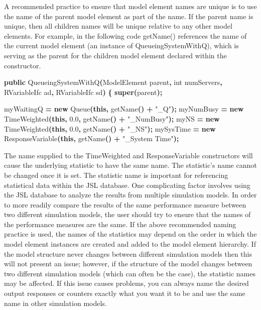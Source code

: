 \documentclass[
]{book}
\newenvironment{Shaded}{\begin{snugshade}}{\end{snugshade}}
\newcommand{\BuiltInTok}[1]{#1}
\newcommand{\DataTypeTok}[1]{\textcolor[rgb]{0.13,0.29,0.53}{#1}}
\newcommand{\FloatTok}[1]{\textcolor[rgb]{0.00,0.00,0.81}{#1}}
\newcommand{\FunctionTok}[1]{\textcolor[rgb]{0.00,0.00,0.00}{#1}}
\newcommand{\KeywordTok}[1]{\textcolor[rgb]{0.13,0.29,0.53}{\textbf{#1}}}
\newcommand{\NormalTok}[1]{#1}
\newcommand{\OperatorTok}[1]{\textcolor[rgb]{0.81,0.36,0.00}{\textbf{#1}}}
\newcommand{\StringTok}[1]{\textcolor[rgb]{0.31,0.60,0.02}{#1}}
\theoremstyle{definition}
\theoremstyle{definition}
\theoremstyle{definition}
\theoremstyle{definition}
\theoremstyle{remark}
\begin{document}
A recommended practice to ensure that model element names are unique is
to use the name of the parent model element as part of the name. If the
parent name is unique, then all children names will be unique relative
to any other model elements. For example, in the following code
getName() references the name of the current model element (an instance
of QueueingSystemWithQ), which is serving as the parent for the children
model element declared within the constructor.

\begin{Shaded}
\begin{Highlighting}[]
\KeywordTok{public} \FunctionTok{QueueingSystemWithQ}\OperatorTok{(}\NormalTok{ModelElement parent}\OperatorTok{,} \DataTypeTok{int}\NormalTok{ numServers}\OperatorTok{,}\NormalTok{ RVariableIfc ad}\OperatorTok{,}\NormalTok{ RVariableIfc sd}\OperatorTok{)} \OperatorTok{\{}
    \KeywordTok{super}\OperatorTok{(}\NormalTok{parent}\OperatorTok{);}

\NormalTok{    myWaitingQ }\OperatorTok{=} \KeywordTok{new} \BuiltInTok{Queue}\OperatorTok{(}\KeywordTok{this}\OperatorTok{,} \FunctionTok{getName}\OperatorTok{()} \OperatorTok{+} \StringTok{"\_Q"}\OperatorTok{);}
\NormalTok{    myNumBusy }\OperatorTok{=} \KeywordTok{new} \FunctionTok{TimeWeighted}\OperatorTok{(}\KeywordTok{this}\OperatorTok{,} \FloatTok{0.0}\OperatorTok{,} \FunctionTok{getName}\OperatorTok{()} \OperatorTok{+} \StringTok{"\_NumBusy"}\OperatorTok{);}
\NormalTok{    myNS }\OperatorTok{=} \KeywordTok{new} \FunctionTok{TimeWeighted}\OperatorTok{(}\KeywordTok{this}\OperatorTok{,} \FloatTok{0.0}\OperatorTok{,} \FunctionTok{getName}\OperatorTok{()} \OperatorTok{+} \StringTok{"\_NS"}\OperatorTok{);}
\NormalTok{    mySysTime }\OperatorTok{=} \KeywordTok{new} \FunctionTok{ResponseVariable}\OperatorTok{(}\KeywordTok{this}\OperatorTok{,} \FunctionTok{getName}\OperatorTok{()} \OperatorTok{+} \StringTok{"\_System Time"}\OperatorTok{);}
\end{Highlighting}
\end{Shaded}

The name supplied to the TimeWeighted and ResponseVariable constructors
will cause the underlying statistic to have the same name. The
statistic's name cannot be changed once it is set. The statistic name is
important for referencing statistical data within the JSL database. One
complicating factor involves using the JSL database to analyze the
results from multiple simulation models. In order to more readily
compare the results of the same performance measure between two
different simulation models, the user should try to ensure that the
names of the performance measures are the same. If the above recommended
naming practice is used, the names of the statistics may depend on the
order in which the model element instances are created and added to the
model element hierarchy. If the model structure never changes between
different simulation models then this will not present an issue;
however, if the structure of the model changes between two different
simulation models (which can often be the case), the statistic names may
be affected. If this issue causes problems, you can always name the
desired output responses or counters exactly what you want it to be and
use the same name in other simulation models.
\end{document}
